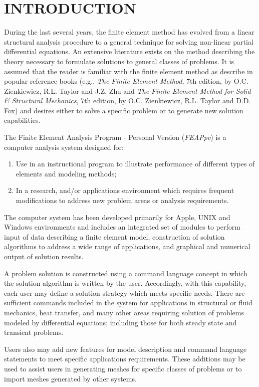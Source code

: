 \chapter[Introduction]{INTRODUCTION}
\label{intro}

During the last several years, the finite element method has evolved
from a linear structural analysis procedure to a general technique
for solving non-linear partial differential equations.  An extensive
literature exists on the method describing
the theory necessary to formulate solutions
to general classes of problems. It is
assumed that the reader is familiar with the finite element method as
describe in popular reference books (e.g., {\it The Finite Element Method},
7th edition, by O.C. Zienkiewicz, R.L. Taylor and J.Z. Zhu and
{\it The Finite Element Method for Solid \& Structural Mechanics},
7th edition, by O.C. Zienkiewicz, R.L. Taylor and D.D. Fox) and
desires either to solve a specific problem or to generate new solution capabilities.

The Finite Element Analysis Program - Personal Version
({\sl FEAPpv}) is a computer analysis system designed for:
\begin{enumerate}
\item Use in an instructional program to illustrate performance
of different types of elements and modeling methods; 
\item In a research, and/or applications
environment which requires frequent modifications to address new
problem areas or analysis requirements.
\end{enumerate}
The computer system has been
developed primarily for Apple, UNIX and Windows environments
and includes an integrated set of modules to perform input of data describing
a finite element model, construction of solution algorithms to address a wide
range of applications, and graphical and numerical output of solution results.

A problem solution is constructed using a command
language concept in which the solution algorithm is
written by the user.  Accordingly, with this capability, each
user may define a solution strategy which meets specific needs.
There are sufficient commands included in the system for
applications in structural or fluid mechanics, heat transfer, and
many other areas requiring solution of problems modeled by differential
equations; including those
for both steady state and transient problems.

Users also may add new features for model description and command language
statements to meet specific applications requirements. These additions 
may be used to assist users in generating meshes
for specific classes of problems or to import meshes generated by other
systems.

